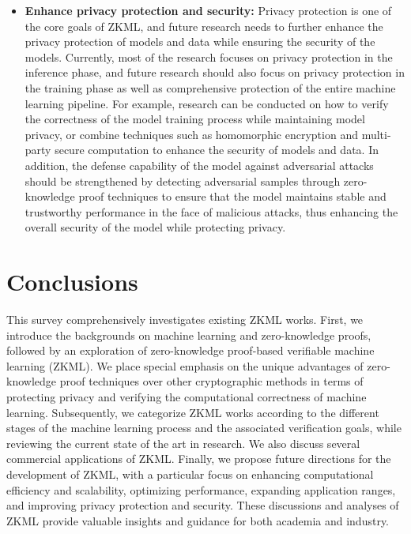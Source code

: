 \documentclass[journal]{IEEEtran}
\begin{document}
\begin{itemize}
    \item \textbf{Enhance privacy protection and security:} Privacy protection is one of the core goals of ZKML, and future research needs to further enhance the privacy protection of models and data while ensuring the security of the models. Currently, most of the research focuses on privacy protection in the inference phase, and future research should also focus on privacy protection in the training phase as well as comprehensive protection of the entire machine learning pipeline. For example, research can be conducted on how to verify the correctness of the model training process while maintaining model privacy, or combine techniques such as homomorphic encryption and multi-party secure computation to enhance the security of models and data. In addition, the defense capability of the model against adversarial attacks should be strengthened by detecting adversarial samples through zero-knowledge proof techniques to ensure that the model maintains stable and trustworthy performance in the face of malicious attacks, thus enhancing the overall security of the model while protecting privacy.
\end{itemize}

\section{Conclusions}\label{s:6}
This survey comprehensively investigates existing ZKML works. First, we introduce the backgrounds on machine learning and zero-knowledge proofs, followed by an exploration of zero-knowledge proof-based verifiable machine learning (ZKML). We place special emphasis on the unique advantages of zero-knowledge proof techniques over other cryptographic methods in terms of protecting privacy and verifying the computational correctness of machine learning. Subsequently, we categorize ZKML works according to the different stages of the machine learning process and the associated verification goals, while reviewing the current state of the art in research. We also discuss several commercial applications of ZKML. Finally, we propose future directions for the development of ZKML, with a particular focus on enhancing computational efficiency and scalability, optimizing performance, expanding application ranges, and improving privacy protection and security. These discussions and analyses of ZKML provide valuable insights and guidance for both academia and industry.



\end{document}
